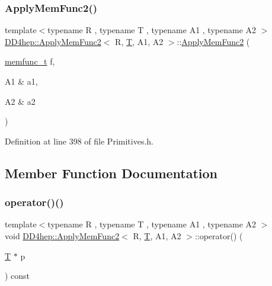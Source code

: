 \subsubsection{\texorpdfstring{Apply\+Mem\+Func2()}{ApplyMemFunc2()}}
{\footnotesize\ttfamily template$<$typename R , typename T , typename A1 , typename A2 $>$ \\
\hyperlink{struct_d_d4hep_1_1_apply_mem_func2}{D\+D4hep\+::\+Apply\+Mem\+Func2}$<$ R, \hyperlink{class_t}{T}, A1, A2 $>$\+::\hyperlink{struct_d_d4hep_1_1_apply_mem_func2}{Apply\+Mem\+Func2} (\begin{DoxyParamCaption}\item[{\hyperlink{struct_d_d4hep_1_1_apply_mem_func2_a73ec255989fcf165046db1689d8c748a}{memfunc\+\_\+t}}]{f,  }\item[{A1 \&}]{a1,  }\item[{A2 \&}]{a2 }\end{DoxyParamCaption})\hspace{0.3cm}{\ttfamily [inline]}}



Definition at line 398 of file Primitives.\+h.



\subsection{Member Function Documentation}
\hypertarget{struct_d_d4hep_1_1_apply_mem_func2_abe561ce984121449249cc7f371986686}{}\label{struct_d_d4hep_1_1_apply_mem_func2_abe561ce984121449249cc7f371986686} 
\subsubsection{\texorpdfstring{operator()()}{operator()()}}
{\footnotesize\ttfamily template$<$typename R , typename T , typename A1 , typename A2 $>$ \\
void \hyperlink{struct_d_d4hep_1_1_apply_mem_func2}{D\+D4hep\+::\+Apply\+Mem\+Func2}$<$ R, \hyperlink{class_t}{T}, A1, A2 $>$\+::operator() (\begin{DoxyParamCaption}\item[{\hyperlink{class_t}{T} $\ast$}]{p }\end{DoxyParamCaption}) const\hspace{0.3cm}{\ttfamily [inline]}}



